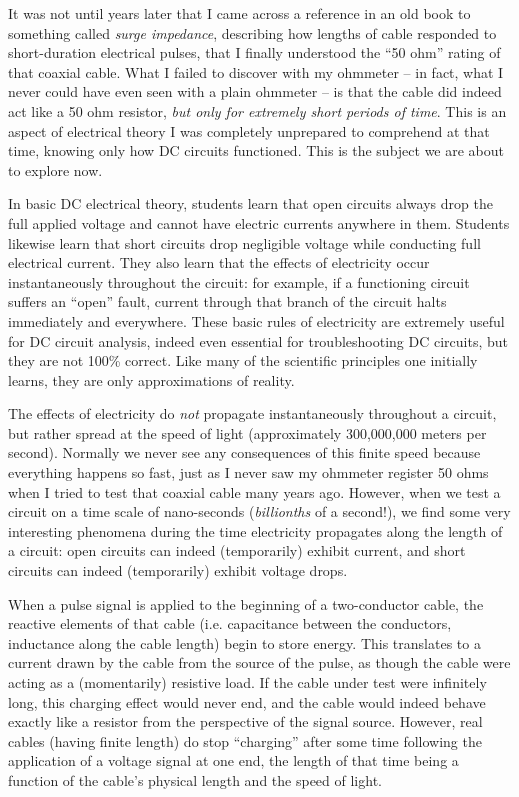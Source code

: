 It was not until years later that I came across a reference in an old book to something called \textit{surge impedance}, describing how lengths of cable responded to short-duration electrical pulses, that I finally understood the ``50 ohm'' rating of that coaxial cable.  What I failed to discover with my ohmmeter -- in fact, what I never could have even seen with a plain ohmmeter -- is that the cable did indeed act like a 50 ohm resistor, \textit{but only for extremely short periods of time}.  This is an aspect of electrical theory I was completely unprepared to comprehend at that time, knowing only how DC circuits functioned.  This is the subject we are about to explore now.

\vskip 10pt


In basic DC electrical theory, students learn that open circuits always drop the full applied voltage and cannot have electric currents anywhere in them.  Students likewise learn that short circuits drop negligible voltage while conducting full electrical current.  They also learn that the effects of electricity occur instantaneously throughout the circuit: for example, if a functioning circuit suffers an ``open'' fault, current through that branch of the circuit halts immediately and everywhere.  These basic rules of electricity are extremely useful for DC circuit analysis, indeed even essential for troubleshooting DC circuits, but they are not 100\% correct.  Like many of the scientific principles one initially learns, they are only approximations of reality.

The effects of electricity do \textit{not} propagate instantaneously throughout a circuit, but rather spread at the speed of light (approximately 300,000,000 meters per second).  Normally we never see any consequences of this finite speed because everything happens so fast, just as I never saw my ohmmeter register 50 ohms when I tried to test that coaxial cable many years ago.  However, when we test a circuit on a time scale of nano-seconds (\textit{billionths} of a second!), we find some very interesting phenomena during the time electricity propagates along the length of a circuit: open circuits can indeed (temporarily) exhibit current, and short circuits can indeed (temporarily) exhibit voltage drops.

When a pulse signal is applied to the beginning of a two-conductor cable, the reactive elements of that cable (i.e. capacitance between the conductors, inductance along the cable length) begin to store energy.  This translates to a current drawn by the cable from the source of the pulse, as though the cable were acting as a (momentarily) resistive load.  If the cable under test were infinitely long, this charging effect would never end, and the cable would indeed behave exactly like a resistor from the perspective of the signal source.  However, real cables (having finite length) do stop ``charging'' after some time following the application of a voltage signal at one end, the length of that time being a function of the cable's physical length and the speed of light.

